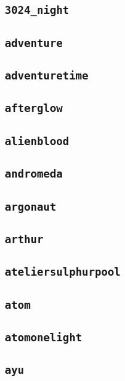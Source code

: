 \subsection{\texttt{3024\_night}}
\newpage
\subsection{\texttt{adventure}}
\newpage
\subsection{\texttt{adventuretime}}
\newpage
\subsection{\texttt{afterglow}}
\newpage
\subsection{\texttt{alienblood}}
\newpage
\subsection{\texttt{andromeda}}
\newpage
\subsection{\texttt{argonaut}}
\newpage
\subsection{\texttt{arthur}}
\newpage
\subsection{\texttt{ateliersulphurpool}}
\newpage
\subsection{\texttt{atom}}
\newpage
\subsection{\texttt{atomonelight}}
\newpage
\subsection{\texttt{ayu}}
\newpage

